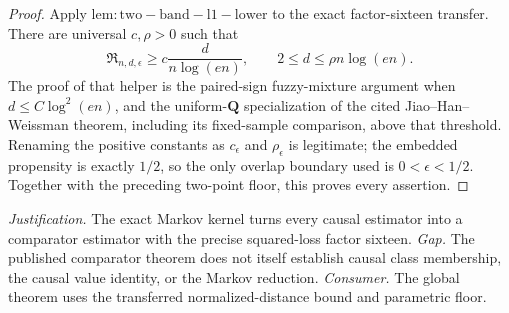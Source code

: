 \documentclass{article}
\begin{document}
\begin{proof}
Apply \(\mathrm{lem:two-band-l1-lower}\) to the exact factor-sixteen transfer.  There are universal \(c,\rho>0\) such that
\[
 \mathfrak R_{n,d,\epsilon}
 \ge c\frac d{n\log(en)},
 \qquad
 2\le d\le\rho n\log(en).
\]
The proof of that helper is the paired-sign fuzzy-mixture argument when \(d\le C\log^2(en)\), and the uniform-\(\mathbf Q\) specialization of the cited Jiao--Han--Weissman theorem, including its fixed-sample comparison, above that threshold.  Renaming the positive constants as \(c_\epsilon\) and \(\rho_\epsilon\) is legitimate; the embedded propensity is exactly \(1/2\), so the only overlap boundary used is \(0<\epsilon<1/2\).  Together with the preceding two-point floor, this proves every assertion.
\end{proof}
\par\smallskip\noindent \textit{Justification.} The exact Markov kernel turns every causal estimator into a comparator estimator with the precise squared-loss factor sixteen. \textit{Gap.} The published comparator theorem does not itself establish causal class membership, the causal value identity, or the Markov reduction. \textit{Consumer.} The global theorem uses the transferred normalized-distance bound and parametric floor.
\end{document}

